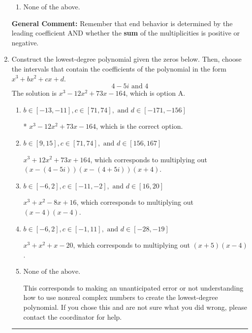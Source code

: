 \documentclass{extbook}[14pt]
\newcommand{\litem}[1]{\item #1

\rule{\textwidth}{0.4pt}}
\begin{document}
\begin{enumerate}
{\begin{enumerate}[label=\Alph*.]
\begin{multicols}{2}
\end{multicols}\item None of the above.\end{enumerate}
\textbf{General Comment:} Remember that end behavior is determined by the leading coefficient AND whether the \textbf{sum} of the multiplicities is positive or negative.
}
\litem{
Construct the lowest-degree polynomial given the zeros below. Then, choose the intervals that contain the coefficients of the polynomial in the form $x^3+bx^2+cx+d$.
\[ 4 - 5 i \text{ and } 4 \]The solution is \( x^{3} -12 x^{2} +73 x -164 \), which is option A.\begin{enumerate}[label=\Alph*.]
\item \( b \in [-13, -11], c \in [71, 74], \text{ and } d \in [-171, -156] \)

* $x^{3} -12 x^{2} +73 x -164$, which is the correct option.
\item \( b \in [9, 15], c \in [71, 74], \text{ and } d \in [156, 167] \)

$x^{3} +12 x^{2} +73 x + 164$, which corresponds to multiplying out $(x-(4 - 5 i))(x-(4 + 5 i))(x + 4)$.
\item \( b \in [-6, 2], c \in [-11, -2], \text{ and } d \in [16, 20] \)

$x^{3} + x^{2} -8 x + 16$, which corresponds to multiplying out $(x -4)(x -4)$.
\item \( b \in [-6, 2], c \in [-1, 11], \text{ and } d \in [-28, -19] \)

$x^{3} + x^{2} +x -20$, which corresponds to multiplying out $(x + 5)(x -4)$.
\item \( \text{None of the above.} \)

This corresponds to making an unanticipated error or not understanding how to use nonreal complex numbers to create the lowest-degree polynomial. If you chose this and are not sure what you did wrong, please contact the coordinator for help.
\end{enumerate}

}
\end{enumerate}
\end{document}
